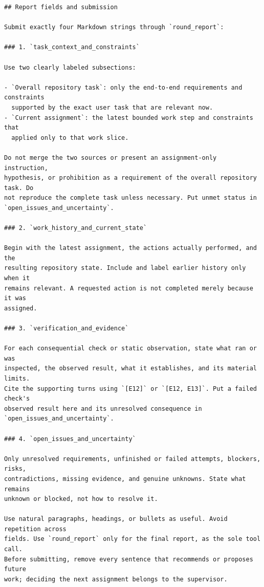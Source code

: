 \begin{lstlisting}[style=looparenaprompt]
## Report fields and submission

Submit exactly four Markdown strings through `round_report`:

### 1. `task_context_and_constraints`

Use two clearly labeled subsections:

- `Overall repository task`: only the end-to-end requirements and constraints
  supported by the exact user task that are relevant now.
- `Current assignment`: the latest bounded work step and constraints that
  applied only to that work slice.

Do not merge the two sources or present an assignment-only instruction,
hypothesis, or prohibition as a requirement of the overall repository task. Do
not reproduce the complete task unless necessary. Put unmet status in
`open_issues_and_uncertainty`.

### 2. `work_history_and_current_state`

Begin with the latest assignment, the actions actually performed, and the
resulting repository state. Include and label earlier history only when it
remains relevant. A requested action is not completed merely because it was
assigned.

### 3. `verification_and_evidence`

For each consequential check or static observation, state what ran or was
inspected, the observed result, what it establishes, and its material limits.
Cite the supporting turns using `[E12]` or `[E12, E13]`. Put a failed check's
observed result here and its unresolved consequence in
`open_issues_and_uncertainty`.

### 4. `open_issues_and_uncertainty`

Only unresolved requirements, unfinished or failed attempts, blockers, risks,
contradictions, missing evidence, and genuine unknowns. State what remains
unknown or blocked, not how to resolve it.

Use natural paragraphs, headings, or bullets as useful. Avoid repetition across
fields. Use `round_report` only for the final report, as the sole tool call.
Before submitting, remove every sentence that recommends or proposes future
work; deciding the next assignment belongs to the supervisor.
\end{lstlisting}


